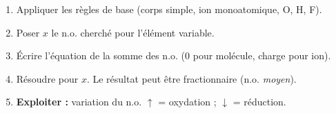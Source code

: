 \documentclass[11pt]{article}
\begin{document}
\begin{methode}
\begin{enumerate}
\item Appliquer les règles de base (corps simple, ion monoatomique, O, H, F).
\item Poser $x$ le n.o. cherché pour l'élément variable.
\item Écrire l'équation de la somme des n.o. (0 pour molécule, charge pour ion).
\item Résoudre pour $x$. Le résultat peut être fractionnaire (n.o. \emph{moyen}).
\item \textbf{Exploiter :} variation du n.o. $\uparrow$ = oxydation ; $\downarrow$ = réduction.
\end{enumerate}
\end{methode}
\end{document}
